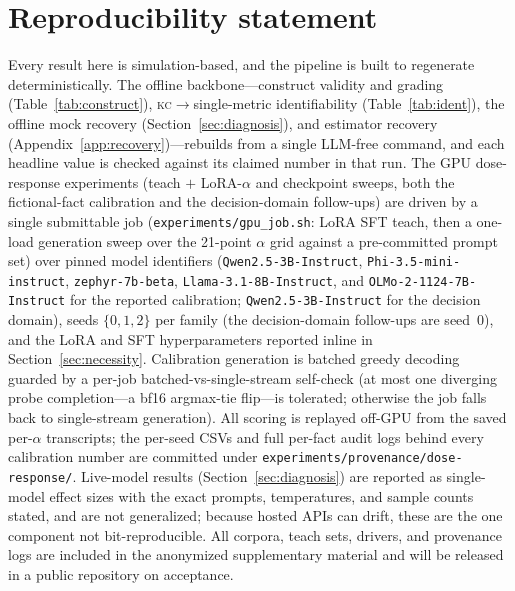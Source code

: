 \documentclass{article}
\newcommand{\kc}{\textsc{kc}}
\begin{document}
\section*{Reproducibility statement}
Every result here is simulation-based, and the pipeline is built to regenerate deterministically. The
offline backbone---construct validity and grading (Table~\ref{tab:construct}),
\kc$\to$single-metric identifiability (Table~\ref{tab:ident}), the offline mock recovery
(Section~\ref{sec:diagnosis}), and estimator recovery (Appendix~\ref{app:recovery})---rebuilds from a
single LLM-free command, and each headline value is checked against its claimed number in that run. The
GPU dose-response experiments (teach $+$ LoRA-$\alpha$ and checkpoint sweeps, both the fictional-fact
calibration and the decision-domain follow-ups) are driven by a single submittable job
(\texttt{experiments/gpu\_job.sh}: LoRA SFT teach, then a one-load generation sweep over the 21-point
$\alpha$ grid against a pre-committed prompt set) over pinned model identifiers
(\texttt{Qwen2.5-3B-Instruct}, \texttt{Phi-3.5-mini-instruct}, \texttt{zephyr-7b-beta},
\texttt{Llama-3.1-8B-Instruct}, and \texttt{OLMo-2-1124-7B-Instruct} for the reported calibration;
\texttt{Qwen2.5-3B-Instruct} for the decision domain), seeds $\{0,1,2\}$ per family (the
decision-domain follow-ups are seed~$0$), and the LoRA and SFT hyperparameters reported inline in
Section~\ref{sec:necessity}. Calibration generation is batched greedy decoding guarded by a per-job batched-vs-single-stream
self-check (at most one diverging probe completion---a bf16 argmax-tie flip---is tolerated;
otherwise the job falls back to single-stream generation).
All scoring is replayed off-GPU from the saved per-$\alpha$ transcripts;
the per-seed CSVs and full per-fact audit logs behind every calibration number are committed under
\texttt{experiments/provenance/dose-response/}. Live-model results
(Section~\ref{sec:diagnosis}) are reported as single-model effect sizes with the exact prompts,
temperatures, and sample counts stated, and are not generalized; because hosted APIs can drift, these
are the one component not bit-reproducible. All corpora, teach sets, drivers, and provenance logs are
included in the anonymized supplementary material and will be released in a public repository on
acceptance.

\appendix
\end{document}
